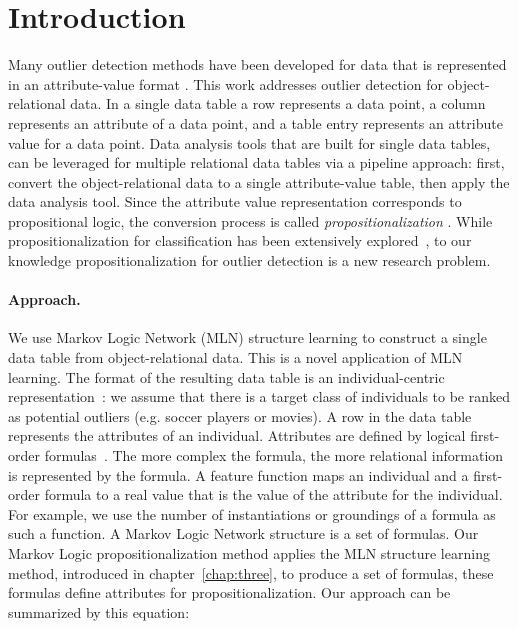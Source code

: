 		\section{Introduction} Many outlier detection methods have been developed for data that is represented in an attribute-value format \cite{aggarwal2013}. 
		This work addresses outlier detection for object-relational data. In a single data table a row represents a data point, a column represents an attribute of a data point, and a table entry represents an attribute value for a data point. 
		Data analysis tools that are built for single data tables, can be leveraged for multiple relational data tables via a pipeline approach: first, convert the object-relational data to a single attribute-value table, then apply the data analysis tool. Since the attribute value representation corresponds to propositional logic, the conversion process is called {\em propositionalization} \cite{Kramer2000}. 
		While propositionalization for classification has been extensively explored~\cite{Kramer2000,Lavrac13,Lavravc2014,kuzelka2008}, to our knowledge propositionalization for outlier detection is a new research problem.
		
		\paragraph{Approach.} We use Markov Logic Network (MLN) structure learning to construct a single data table from object-relational data. This is a novel application of MLN learning. The format of the resulting data table is an individual-centric representation~\cite{Lippi2011,Lavrac13}:  we assume that there is a target class of individuals to be ranked as potential outliers (e.g. soccer players or movies). A row in the data table represents the attributes of an individual. Attributes are defined by logical first-order formulas~\cite{Lippi2011}. The more complex the formula, the more relational information is represented by the formula. 
		A feature function maps an individual and a first-order formula to a real value that is the value of the attribute for the individual. For example, we use the number of instantiations or groundings of a formula as such a function. 
		A Markov Logic Network structure is a set of formulas.  Our Markov Logic propositionalization method applies the MLN structure learning method, introduced in chapter~\ref{chap:three}, to produce a set of formulas, these formulas define attributes for propositionalization. Our approach can be summarized by this equation:\\
		
